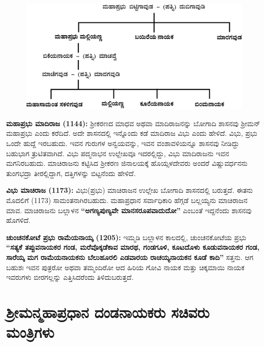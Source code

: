\begin{figure}[H]
\includegraphics[scale=.15]{images/chap3/chap3fig10.jpeg}
\end{figure}

\textbf{ಮಹಾಪ್ರಭು ಮಾದಿರಾಜ (1144):} ಶ‍್ರೀಕರಣದ ಮಾಧವ ಅಥವಾ ಮಾದಿರಾಜನನ್ನು ಬೋಗಾದಿ ಶಾಸನವು ಶ‍್ರೀಮನ್\-​ಮಹಾಪ್ರಭು ಎಂದು ಕರೆದಿದೆ. ಅದೇ ಶಾಸನದಲ್ಲಿ ಇನ್ನೊಂದು ಕಡೆ ಮಾದಿರಾಜ ವಿಭು ಎಂದು ಹೇಳಿದೆ. ವಿಭು, ಪ್ರಭು ಒಂದೇ ಹುದ್ದೆ ಇರಬಹುದು. ಇವನ ಗುರುಗಳ ಅನ್ವಯವನ್ನು, ಇವನ ವಂಶಾವಳಿಯನ್ನೂ ಶಾಸನವು ನೀಡಿದ್ದು ಬಹುಭಾಗ ತ್ರುಟಿತವಾಗಿದೆ. ವಿಭು ಪದ್ಮನಾಭನ ಉಲ್ಲೇಖವೂ ಇದರಲ್ಲಿದ್ದು, ವಿಭು ಮಾದಿರಾಜನು ಇವನ ಮಗನಿರಬಹುದು. ಮಾಚಿರಾಜನು ಕಟ್ಟಿಸಿದ ಶ‍್ರೀಕರಣ ಜಿನಾಲಯಕ್ಕೆ ಹೊಯ್ಸಳದೇವರು ಅಂದರೆ ವಿಷ್ಣುವರ್ಧನನು ತುಂಗಭದ್ರಾ ತೀರಲ್ಲಿದ್ದಾಗ, ದತ್ತಿಗಳನ್ನು ಬಿಟ್ಟನೆಂದು ಹೇಳಿದೆ.

\textbf{ವಿಭು ಮಾಚಿರಾಜ (1173):} ವಿಭು(ಪ್ರಭು) ಮಾಚಿರಾಜನ ಉಲ್ಲೇಖ ಬೋಗಾದಿ ಶಾಸನದಲ್ಲಿ ಬರುತ್ತದೆ. ಈತನು ಮೊದಲಿಗೆ (1173) ಸಾಮಂತನಾಗಿರಬಹುದು. ಮಹಾಪ್ರಧಾನ ಸರ್ವಾಧಿಕಾರಿ ಹೆಗ್ಗಡೆ ಬಲ್ಲಯ್ಯನು ಮಾಚಿರಾಜನ ಮಾವ. ಮಾಚಿರಾಜನು ಬಲ್ಲಾಳನ \textbf{“ಅಗಣ್ಯಪುಣ್ಯವೇ ಮಾನಸರೂಪವಾದುದೋ”} ಎಂಬಂತೆ ಇದ್ದನೆಂದು ಶಾಸನವು ಹೊಗಳಿದೆ.

\textbf{ಚುಂಚನಕೋಟೆ ಪ್ರಭು ರಾಮೆಯನಾಯ್ಕ (1205):} ಇಮ್ಮಡಿ ಬಲ್ಲಾಳನ ಕಾಲದಲ್ಲಿ, ಚುಂಚನಕೋಟೆಯ ಪ್ರಭು \textbf{“ಸತ್ಯಕೆ ತಪ್ಪುವನಾಯಕರ ಗಂಡ, ಮರೆವೊಕ್ಕಡೆಕಾವ ಮಾರಥ, ಗಂಡಗೂಳಿ, ಕೂಟದೊಳು ಕೂಡುವನಾಯಕರ ಗಂಡ, ಸಾರೆಯ್ಕ ಮಗ ರಾಮೆಯನಾಯಕನು ಬೆಲುಹೂರಲಿ ಎಡವಾರಯ ರಾಚಯ್ಯನಾಯಕನ ಕೂಡೆ ಕಾದಿ”} ಸತ್ತನು. ಆಗ ಬಹುಶಃ ಇವನ ಪುತ್ರರೋ ಅಥವಾ ತಮ್ಮಂದಿರೋ ಆದ ಹಿರಿಯ ಗೋವಿ ನಾಯಕ ಮತ್ತು ಚಿಕ್ಕಮಾಯಿ ನಾಯಕ ಇವರುಗಳು ಬೀರಗಲ್ಲನ್ನು ಎತ್ತಿಸಿದರೆಂದು ತಿಳಿದುಬರುತ್ತದೆ.

\section{ಶ‍್ರೀಮನ್ಮಹಾಪ್ರಧಾನ ದಂಡನಾಯಕರು\enginline{-} ಸಚಿವರು\enginline{-} ಮಂತ್ರಿಗಳು}

